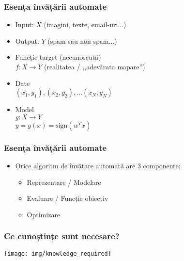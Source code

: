 \documentclass{beamer}
\newcommand*{\utb}{\item[{\texttt{[image: img/UTSymbols-Bullet.png]}}]}
\newcommand{\sign}[1]{\ensuremath{\operatorname{sign(\mathit{#1})}}}
\begin{document}
\begin{frame}
    \frametitle{Esența învățării automate}
    \begin{itemize}
        \utb Input: $X$ (imagini, texte, email-uri...)
        \utb Output: $Y$ (spam sau non-spam...)
        \utb Funcție target (necunoscută) \\ $f : X \rightarrow Y$ (realitatea / ,,adevărata mapare'')
        \utb Date \\ $(x_1, y_1), (x_2, y_2), \dots (x_N, y_N)$
        \utb Model \\ $g : X \rightarrow Y$ \\ $y = g(x) = \sign{w^Tx}$
    \end{itemize}
\end{frame}

\begin{frame}
    \frametitle{Esența învățării automate}
    \begin{itemize}
        \utb Orice algoritm de învățare automată are 3 componente:
        \begin{itemize}
            \utb Reprezentare / Modelare
            \utb Evaluare / Funcție obiectiv
            \utb Optimizare
        \end{itemize}
    \end{itemize}
\end{frame}

\begin{frame}
    \frametitle{Ce cunoștințe sunt necesare?}
    \begin{center}
        \texttt{[image: img/knowledge\_required]}
    \end{center}
\end{frame}
\end{document}
